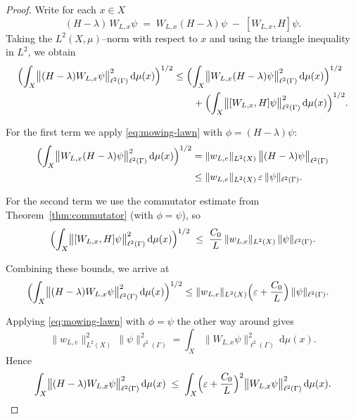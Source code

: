 \documentclass[11pt]{article}
\theoremstyle{definition}
\begin{document}
\begin{proof}
Write for each $x\in X$
\[
(H-\lambda )\,W_{L,x}\psi
\;=\; W_{L,x}(H-\lambda )\psi \;-\; [W_{L,x},H]\psi .
\]
Taking the $L^2(X,\mu)$–norm with respect to $x$ and using the triangle inequality
in $L^2$, we obtain
\begin{align*}
 \Bigl(\int_{X} \bigl\|(H - \lambda ) W_{L,x} \psi\bigr\|_{\ell^2(\Gamma)}^2
       \,\mathrm{d}\mu(x)\Bigr)^{1/2}
 &\leq  \Bigl(\int_{X} \bigl\|W_{L,x} (H - \lambda) \psi\bigr\|_{\ell^2(\Gamma)}^2\,
              \mathrm{d}\mu(x)\Bigr)^{1/2} \\
 &\qquad + \Bigl(\int_{X} \bigl\|[W_{L,x}, H] \psi\bigr\|_{\ell^2(\Gamma)}^2\,
                  \mathrm{d}\mu(x)\Bigr)^{1/2}.
\end{align*}

For the first term we apply \eqref{eq:mowing-lawn} with $\phi=(H-\lambda )\psi$:
\begin{align*}
\Bigl(\int_{X} \bigl\|W_{L,x} (H - \lambda ) \psi\bigr\|_{\ell^2(\Gamma)}^2\,\mathrm{d}\mu(x)\Bigr)^{1/2}
&= \|w_{L,e}\|_{L^2(X)} \,\bigl\|(H - \lambda ) \psi\bigr\|_{\ell^2(\Gamma)} \\
&\leq \|w_{L,e}\|_{L^2(X)}\, \varepsilon\, \|\psi\|_{\ell^2(\Gamma)}.
\end{align*}

For the second term we use the commutator estimate from
Theorem~\ref{thm:commutator} (with $\phi=\psi$), 
so
\[
\Bigl(\int_{X} \bigl\|[W_{L,x}, H] \psi\bigr\|_{\ell^2(\Gamma)}^{2}\,\mathrm{d}\mu(x)\Bigr)^{1/2}
\;\le\;
\frac{C_0}{L}\,\|w_{L,e}\|_{L^{2}(X)}\,\|\psi\|_{\ell^2(\Gamma)}.
\]

Combining these bounds, we arrive at
\begin{align*}
\Bigl(\int_{X} \bigl\|(H - \lambda ) W_{L,x} \psi\bigr\|_{\ell^2(\Gamma)}^2\,\mathrm{d}\mu(x)\Bigr)^{1/2}
&\leq \|w_{L,e}\|_{L^2(X)}
      \Bigl(\varepsilon + \frac{C_0}{L}\Bigr)\,\|\psi\|_{\ell^2(\Gamma)}.
\end{align*}

Applying \eqref{eq:mowing-lawn} with $\phi=\psi$ the other way around gives
\[
 \|w_{L,e}\|_{L^2(X)}^2\,\|\psi\|_{\ell^2(\Gamma)}^2 = \int_{X} \bigl\|W_{L,x}\psi\bigr\|_{\ell^2(\Gamma)}^2\,\mathrm{d}\mu(x).
\]
Hence
\begin{equation}
\label{eq:measure argument needed}
\int_{X} \bigl\|(H - \lambda ) W_{L,x} \psi\bigr\|_{\ell^2(\Gamma)}^2\,\mathrm{d}\mu(x)
 \;\leq\;
\int_{X} \Bigl(\varepsilon + \frac{C_0}{L}\Bigr)^{2}
                 \bigl\|W_{L,x}\psi\bigr\|_{\ell^2(\Gamma)}^2\,\mathrm{d}\mu(x).
\end{equation}


\end{proof}
\end{document}
